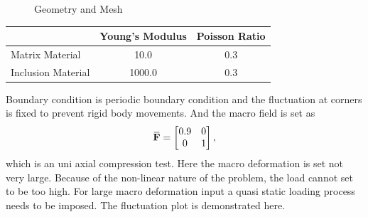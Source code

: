 \documentclass[10pt,a4paper]{scrreprt}
\newcommand{\overbar}[1]{\mkern 1.5mu\overline{\mkern-1.5mu#1\mkern-1.5mu}\mkern 1.5mu}
\begin{document}
\begin{figure}[h]
  \centering
  \caption{Geometry and Mesh}
  \label{fig: inc}
\end{figure} 

\begin{center}
\begin{tabular}{l|c|c}
\hline
& Young's Modulus & Poisson Ratio \\
\hline
Matrix Material & 10.0 & 0.3 \\
Inclusion Material & 1000.0 & 0.3 \\
\hline
\end{tabular}
\end{center}
Boundary condition is periodic boundary condition and the fluctuation at corners is fixed to prevent rigid body movements. And the macro field is set as 
\[
\overbar{\mathbf{F}} = 
\begin{bmatrix}
0.9 & 0 \\
0 & 1 \\
\end{bmatrix},
\]
which is an uni axial compression test. Here the macro deformation is set not very large. Because of the non-linear nature of the problem, the load cannot set to be too high. For large macro deformation input a quasi static loading process needs to be imposed. The fluctuation plot is demonstrated here.
\end{document}
